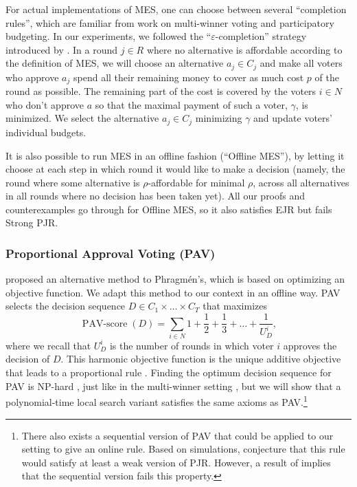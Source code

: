 \documentclass[10pt]{scrartcl}
\theoremstyle{plain}
\theoremstyle{definition}
\renewcommand{\epsilon}{\varepsilon}
\begin{document}
For actual implementations of MES, one can choose between several ``completion rules'', which are familiar from work on multi-winner voting and participatory budgeting. In our experiments, we followed the ``$\epsilon$-completion'' strategy introduced by \cite[Sec.~3.4]{peters2021proportional}. In a round $j \in R$ where no alternative is affordable according to the definition of MES,
we will choose an alternative $a_j \in C_j$ and make all voters who approve $a_j$ spend all their remaining money to cover as much cost $p$ of the round as possible. The remaining part of the cost is covered by the voters $i\in N$ who don't approve $a$ so that the maximal payment of such a voter, $\gamma$, is minimized. We select the alternative $a_j \in C_j$ minimizing $\gamma$ and update voters' individual budgets.



It is also possible to run MES in an offline fashion (``Offline MES''), by letting it choose at each step in which round it would like to make a decision (namely, the round where some alternative is $\rho$-affordable for minimal $\rho$, across all alternatives in all rounds where no decision has been taken yet). All our proofs and counterexamples go through for Offline MES, so it also satisfies EJR but fails Strong PJR.

\enlargethispage{10pt}
\subsubsection{Proportional Approval Voting (PAV)}
\citet{Thie95a} proposed an alternative method to Phragm\'en's, which is based on optimizing an objective function. We adapt this method to our context in an offline way. PAV selects the decision sequence $D \in C_1 \times \dots \times C_T$ that maximizes
\[
\operatorname{PAV-score}(D) = \sum_{i\in N} 1 + \frac12 + \frac13 + \dots + \frac1{U^i_D},
\] 
where we recall that $U^i_D$ is the number of rounds in which voter $i$ approves the decision of $D$. This harmonic objective function is the unique additive objective that leads to a proportional rule \citep{ejr}.
Finding the optimum decision sequence for PAV is NP-hard \citep[Thm.~5.1]{approvalbasedapportionment}, just like in the multi-winner setting \citep{aziz2015computational}, but we will show that a polynomial-time local search variant \citep{aziz2018complexity} satisfies the same axioms as PAV.\footnote{There also exists a sequential version of PAV that could be applied to our setting to give an online rule. Based on simulations, \citet{page2020electingexecutive} conjecture that this rule would satisfy at least a weak version of PJR. However, a result of \citet[Footnote 4]{approvalbasedapportionment} implies that the sequential version fails this property.}
\end{document}
